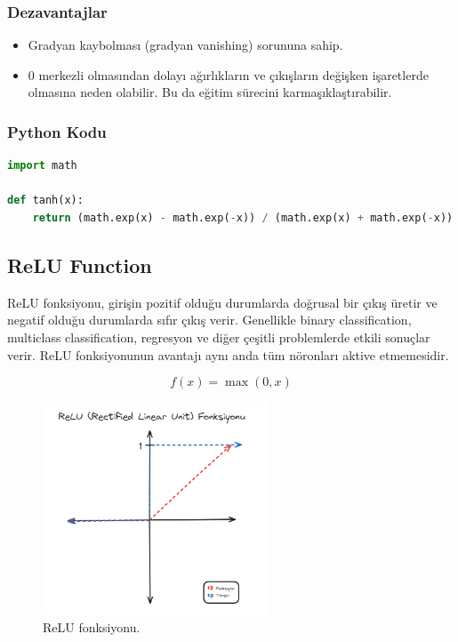 \subsubsection{Dezavantajlar}
\begin{itemize}
    \item Gradyan kaybolması (gradyan vanishing) sorununa sahip.
    \item 0 merkezli olmasından dolayı ağırlıkların ve çıkışların değişken işaretlerde olmasına neden olabilir. Bu da eğitim sürecini karmaşıklaştırabilir.
\end{itemize}

\subsubsection{Python Kodu}

\begin{lstlisting}[language=Python]
import math

def tanh(x):
    return (math.exp(x) - math.exp(-x)) / (math.exp(x) + math.exp(-x))
\end{lstlisting}

\newpage

\subsection{ReLU Function}
ReLU fonksiyonu, girişin pozitif olduğu durumlarda doğrusal bir çıkış üretir ve negatif olduğu durumlarda sıfır çıkış verir. Genellikle binary classification, multiclass classification, regresyon ve diğer çeşitli problemlerde etkili sonuçlar verir. ReLU fonksiyonunun avantajı aynı anda tüm nöronları aktive etmemesidir.

\[f(x) = \max(0, x)\]

\begin{figure}[h]
    \centering
    \includegraphics[width=0.6\textwidth]{images/relu_function.png}
    \caption{ReLU fonksiyonu.}
    \label{fig:enter-label}
\end{figure}


